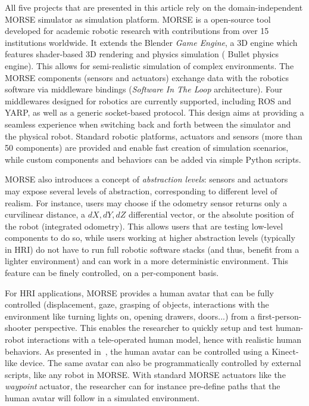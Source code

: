 \documentclass{llncs}
\begin{document}
All five projects that are presented in this article rely on the
domain-independent MORSE simulator as simulation platform. MORSE is a
open-source tool developed for academic robotic research with contributions from
over 15 institutions worldwide. It extends the Blender \emph{Game Engine}, a 3D
engine which features shader-based 3D rendering and physics simulation ({\sc
Bullet} physics engine). This allows for semi-realistic simulation of complex
environments. The MORSE components (sensors and actuators) exchange data with
the robotics software via middleware bindings (\emph{Software In The Loop}
architecture).  Four middlewares designed for robotics are currently supported,
including ROS and YARP, as well as a generic socket-based protocol. This design
aims at providing a seamless experience when switching back and forth between
the simulator and the physical robot. Standard robotic platforms, actuators and
sensors (more than 50 components) are provided and enable fast creation of
simulation scenarios, while custom components and behaviors can be added via
simple Python scripts.


MORSE also introduces a concept of \emph{abstraction levels}: sensors and actuators
may expose several levels of abstraction, corresponding to different level of
realism. For instance, users may choose if the odometry sensor returns only a
curvilinear distance, a $dX, dY, dZ$ differential vector, or the absolute
position of the robot (integrated odometry). This allows users that are testing
low-level components to do so, while users working at higher abstraction
levels (typically in HRI) do not have to run full robotic software stacks (and
thus, benefit from a lighter environment) and can work in a more deterministic
environment. This feature can be finely controlled, on a per-component basis.

For HRI applications, MORSE provides a human avatar that can be fully controlled
(displacement, gaze, grasping of objects, interactions with the environment like
turning lights on, opening drawers, doors...) from a first-person-shooter perspective.
This enables the researcher to quickly setup and test human-robot interactions
with a tele-operated human model, hence with realistic human behaviors. As
presented in~\cite{lemaignan2012morse}, the human avatar can be controlled using
a Kinect-like device. The same avatar can also be programmatically controlled
by external scripts, like any robot in MORSE. With standard MORSE actuators like
the \emph{waypoint} actuator, the researcher can for instance pre-define paths
that the human avatar will follow in a simulated environment.
\end{document}
